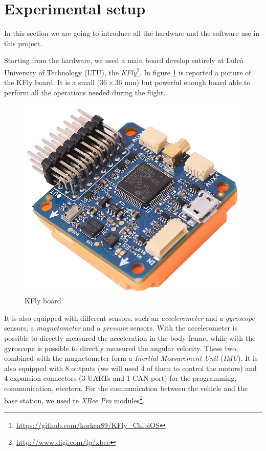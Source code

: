 \section{Experimental setup}

In this section we are going to introduce all the hardware and the software use in this project. 

\noindent Starting from the hardware, we used a main board develop entirely at Lule\r{a} University of Technology (LTU), the \textit{KFly}\footnote{\url{https://github.com/korken89/KFly_ChibiOS}}. In figure \ref{fig:KFly} is reported a picture of the KFly board. It is a small ($36\times 36$ mm) but powerful enough board able to perform all the operations needed during the flight.

\begin{figure}[h] 
	\centering
   	\includegraphics[scale = 0.45]{./images/KFly.png}
   	\caption{KFly board.}
   	\label{fig:KFly}
\end{figure} 

\noindent It is also equipped with different sensors, such an \textit{accelerometer} and a \textit{gyroscope} sensors, a \textit{magnetometer} and a \textit{pressure} sensors. With the accelerometer is possible to directly measured the acceleration in the body frame, while with the gyroscope is possible to directly measured the angular velocity. These two, combined with the magnetometer form a \textit{Inertial Measurement Unit} (\textit{IMU}). It is also equipped with 8 outputs (we will used 4 of them to control the motors) and 4 expansion connectors (3 UARTs and 1 CAN port) for the programming, communication, etcetera. For the communication between the vehicle and the base station, we used te \textit{XBee Pro} modules\footnote{\url{http://www.digi.com/lp/xbee}}.

